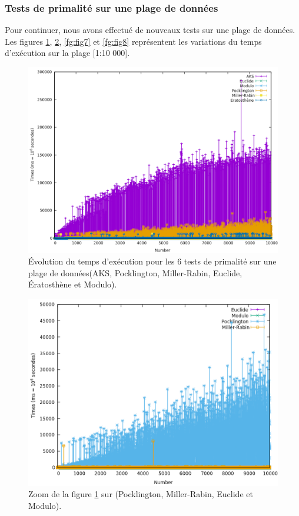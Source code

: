 	\subsubsection{Tests de primalité sur une plage de données}
Pour continuer, nous avons effectué de nouveaux tests sur une plage de données. Les figures \ref{fg:fig5}, \ref{fg:fig6}, \ref{fg:fig7} et \ref{fg:fig8} représentent les variations du temps d'exécution sur la plage [1:10 000].
\begin{figure}[!ht]
		\begin{center}\includegraphics[scale=0.5]{RANGE.png}\end{center}
		\caption{Évolution du temps d'exécution pour les 6 tests de primalité sur une plage de données(AKS, Pocklington, Miller-Rabin, Euclide, Ératosthène et Modulo). }
		\label{fg:fig5}
\end{figure}
\begin{figure}[!ht]
		\begin{center}\includegraphics[scale=0.5]{RZoom1.png}\end{center}
		\caption{Zoom de la figure \ref{fg:fig5} sur (Pocklington, Miller-Rabin, Euclide et Modulo).}
		\label{fg:fig6}
\end{figure}
